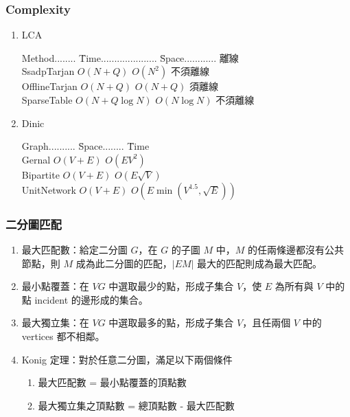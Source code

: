 %

\subsubsection{Complexity}

\begin{enumerate}\itemsep = -5pt

\item LCA
\begin{tabbing}
Method........ \= Time..................... \= Space............ \=  離線\\
SsadpTarjan  \> $O(N + Q)$          \> $O(N ^ 2)$      \>  不須離線\\
OfflineTarjan \> $O(N + Q)$           \> $O(N + Q)$    \>  須離線  \\
SparseTable \> $O(N + Q \log N)$ \> $O(N \log N)$ \>不須離線
\end{tabbing}

\item Dinic
\begin{tabbing}
Graph.......... \= Space........ \= Time\\
Gernal          \> $O(V+E)$ \> $O(EV^2)$  \\
Bipartite        \> $O(V+E)$ \> $O(E\sqrt V)$ \\
UnitNetwork  \> $O(V+E)$ \> $O(E \min(V^{1.5}, \sqrt E))$
\end{tabbing}

\end{enumerate}

\subsubsection{二分圖匹配}

\begin{enumerate}\itemsep = -5pt
\item 最大匹配數：給定二分圖 $G$，在 $G$ 的子圖 $M$ 中，$M$ 的任兩條邊都沒有公共節點，則 $M$ 成為此二分圖的匹配，$|EM|$ 最大的匹配則成為最大匹配。
\item 最小點覆蓋：在 $VG$ 中選取最少的點，形成子集合 $V$，使 $E$ 為所有與 $V$ 中的點 incident 的邊形成的集合。
\item 最大獨立集：在 $VG$ 中選取最多的點，形成子集合 $V$，且任兩個 $V$ 中的 vertices 都不相鄰。
\item Konig 定理：對於任意二分圖，滿足以下兩個條件
\begin{enumerate} \itemsep = -3pt
\item 最大匹配數 = 最小點覆蓋的頂點數
\item 最大獨立集之頂點數 = 總頂點數 - 最大匹配數
\end{enumerate}
\end{enumerate}

